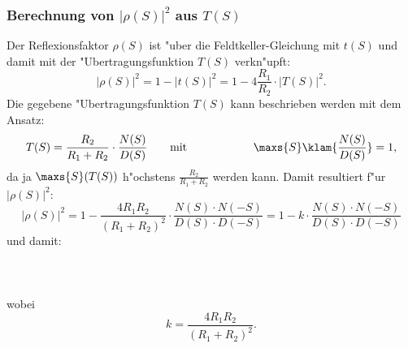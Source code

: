 \subsubsection{{\boldmath Berechnung von $|\rho(S)|^2$ aus $T(S)$}}
Der Reflexionsfaktor $\rho(S)$ ist "uber die Feldtkeller-Gleichung mit
$t(S)$ und damit mit der "Ubertragungsfunktion $T(S)$ verkn"upft:
\begin{equation}
| \rho(S) |^2=1-| t(S) |^2=1-4 \frac{R_1}{R_2} \cdot | T(S) |^2.
\end{equation}
Die gegebene "Ubertragungsfunktion $T(S)$
kann beschrieben werden mit dem Ansatz:
\begin{eqnarray}
T(S)=\frac{R_2}{R_1 + R_2} \cdot \frac{N(S)}{D(S)}\qquad&
{\rm mit}&\qquad \hspace*{1cm} \maxs{S}\klam{\frac{N(S)}{D(S)}}=1, 
\end{eqnarray}
da ja $\maxs{S}(T(S))$ h"ochstens $\frac{R_2}{R_1+R_2}$ werden kann. Damit resultiert f"ur $| \rho(S) |^2$:
\begin{equation*}
| \rho(S) |^2=1-\frac{4 R_1 R_2}{(R_1 + R_2)^2} \cdot 
  \frac{N(S) \cdot N(-S)}{D(S) \cdot D(-S)}=1-k \cdot \frac{N(S) \cdot N(-S)}{D(S) \cdot D(-S)}
\end{equation*}
und damit:\\~~\\
\\~~\\
wobei
\begin{equation}
k=\frac{4 R_1 R_2}{(R_1 + R_2)^2}.
\end{equation}
